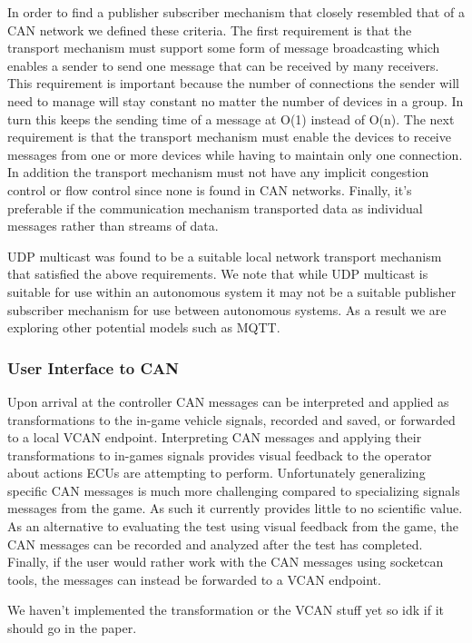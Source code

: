 \documentclass[letterpaper,twocolumn,12pt]{article}
\begin{document}
In order to find a publisher subscriber mechanism that closely resembled that of a CAN network we defined these criteria. The first requirement is that the transport mechanism must support some form of message broadcasting which enables a sender to send one message that can be received by many receivers. This requirement is important because the number of connections the sender will need to manage will stay constant no matter the number of devices in a group. In turn this keeps the sending time of a message at O(1) instead of O(n). The next requirement is that the transport mechanism must enable the devices to receive messages from one or more devices while having to maintain only one connection. In addition the transport mechanism must not have any implicit congestion control or flow control since none is found in CAN networks. Finally, it's preferable if the communication mechanism transported data as individual messages rather than streams of data.

UDP multicast was found to be a suitable local network transport mechanism that satisfied the above requirements. We note that while UDP multicast is suitable for use within an autonomous system it may not be a suitable publisher subscriber mechanism for use between autonomous systems. As a result we are exploring other potential models such as MQTT.

\subsubsection{User Interface to CAN}
Upon arrival at the controller CAN messages can be interpreted and applied as transformations to the in-game vehicle signals, recorded and saved, or forwarded to a local VCAN endpoint. Interpreting CAN messages and applying their transformations to in-games signals provides visual feedback to the operator about actions ECUs are attempting to perform. Unfortunately generalizing specific CAN messages is much more challenging compared to specializing signals messages from the game. As such it currently provides little to no scientific value. As an alternative to evaluating the test using visual feedback from the game, the CAN messages can be recorded and analyzed after the test has completed. Finally, if the user would rather work with the CAN messages using socketcan tools, the messages can instead be forwarded to a VCAN endpoint.
    
We haven't implemented the transformation or the VCAN stuff yet so idk if it should go in the paper.
\end{document}
